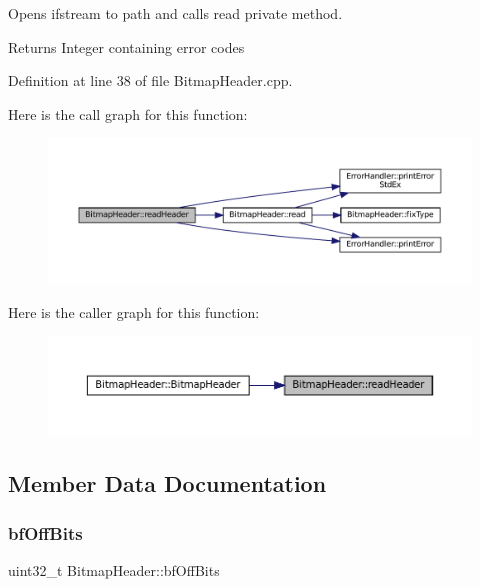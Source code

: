 Opens ifstream to path and calls read private method. 

\begin{DoxyReturn}{Returns}
Integer containing error codes 
\end{DoxyReturn}


Definition at line 38 of file Bitmap\+Header.\+cpp.

Here is the call graph for this function\+:
\nopagebreak
\begin{figure}[H]
\begin{center}
\leavevmode
\includegraphics[width=350pt]{classBitmapHeader_a66adc11592dc1d18edbd46bade1db242_cgraph}
\end{center}
\end{figure}
Here is the caller graph for this function\+:
\nopagebreak
\begin{figure}[H]
\begin{center}
\leavevmode
\includegraphics[width=350pt]{classBitmapHeader_a66adc11592dc1d18edbd46bade1db242_icgraph}
\end{center}
\end{figure}


\subsection{Member Data Documentation}
\mbox{\label{classBitmapHeader_a0b3470f079b95b2a6f053ad7d860ec06}} 
\subsubsection{\texorpdfstring{bfOffBits}{bfOffBits}}
{\footnotesize\ttfamily uint32\+\_\+t Bitmap\+Header\+::bf\+Off\+Bits\hspace{0.3cm}{\ttfamily [private]}}

